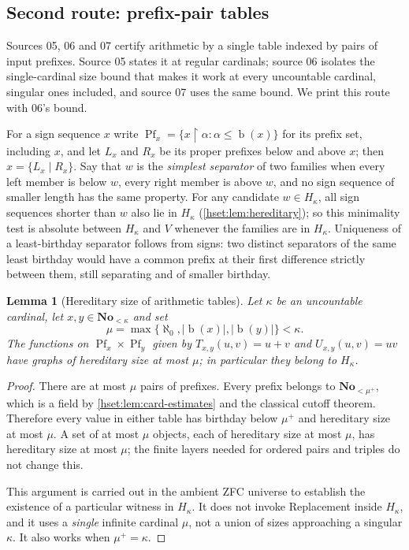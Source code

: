 \documentclass[11pt,letterpaper]{article}
\newtheorem{lemma}[lemma]{Lemma}\aliascntresetthe{lemma}
\theoremstyle{definition}
\theoremstyle{remark}
\newcommand{\No}{\mathbf{No}}
\newcommand{\bd}{\operatorname{b}}
\newcommand{\card}[1]{\lvert#1\rvert}
\begin{document}
\subsection{Second route: prefix-pair tables}
\label{hset:sub:tables}

Sources 05, 06 and 07 certify arithmetic by a single table indexed by pairs of
input prefixes. Source 05 states it at regular cardinals; source 06 isolates
the single-cardinal size bound that makes it work at every uncountable
cardinal, singular ones included, and source 07 uses the same bound. We print
this route with 06's bound.

For a sign sequence $x$ write $\operatorname{Pf}_x=\{x\mathbin{\upharpoonright}\alpha:
\alpha\le\bd(x)\}$ for its prefix set, including $x$, and let $L_x$ and $R_x$
be its proper prefixes below and above $x$; then $x=\{L_x\mid R_x\}$. Say that
$w$ is the \emph{simplest separator} of two families when every left member is
below $w$, every right member is above $w$, and no sign sequence of smaller
length has the same property. For any candidate $w\in H_\kappa$, all sign
sequences shorter than $w$ also lie in $H_\kappa$ (\cref{hset:lem:hereditary});
so this minimality test is absolute between $H_\kappa$ and $V$ whenever the
families are in $H_\kappa$. Uniqueness of a least-birthday separator follows
from signs: two distinct separators of the same least birthday would have a
common prefix at their first difference strictly between them, still
separating and of smaller birthday.

\begin{lemma}[Hereditary size of arithmetic tables]\label{hset:lem:tables}
Let $\kappa$ be an uncountable cardinal, let $x,y\in\No_{<\kappa}$ and set
\[
 \mu=\max\{\aleph_0,\card{\bd(x)},\card{\bd(y)}\}<\kappa.
\]
The functions on $\operatorname{Pf}_x\times\operatorname{Pf}_y$ given by $T_{x,y}(u,v)=u+v$ and
$U_{x,y}(u,v)=uv$ have graphs of hereditary size at most $\mu$; in particular
they belong to $H_\kappa$.
\end{lemma}
\begin{proof}
There are at most $\mu$ pairs of prefixes. Every prefix belongs to
$\No_{<\mu^+}$, which is a field by \cref{hset:lem:card-estimates} and the
classical cutoff theorem. Therefore every value in either table has birthday
below $\mu^+$ and hereditary size at most $\mu$. A set of at most $\mu$ objects,
each of hereditary size at most $\mu$, has hereditary size at most $\mu$; the
finite layers needed for ordered pairs and triples do not change this.

This argument is carried out in the ambient ZFC universe to establish the
existence of a particular witness in $H_\kappa$. It does not invoke
Replacement inside $H_\kappa$, and it uses a \emph{single} infinite cardinal
$\mu$, not a union of sizes approaching a singular $\kappa$. It also works when
$\mu^+=\kappa$.
\end{proof}
\end{document}
